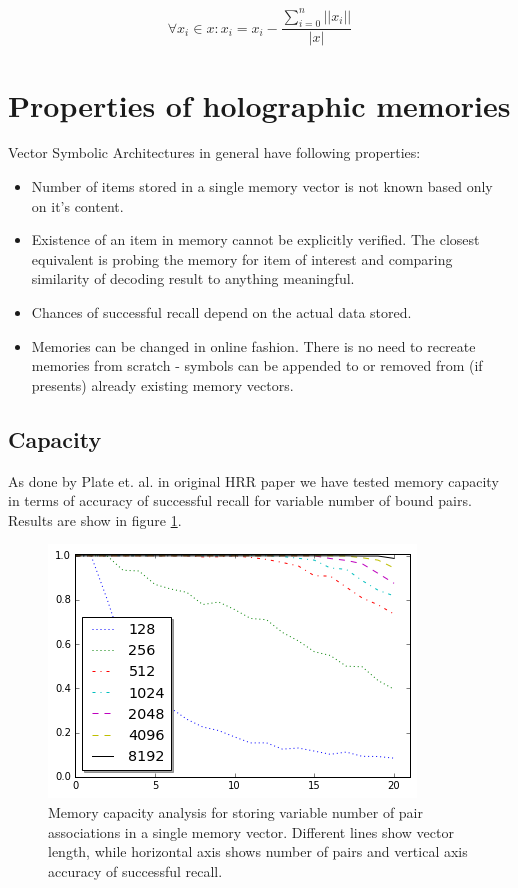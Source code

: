 \documentclass[conference]{IEEEtran}
\begin{document}
	\[ \forall x_i \in x: x_i = x_i - \frac{\sum_{i=0}^n ||x_i||}{|x|} \]
	
	\section{Properties of holographic memories}
	
	Vector Symbolic Architectures in general have following properties:
	\begin{itemize}
		\item Number of items stored in a single memory vector is not known based only on it's content.
		\item Existence of an item in memory cannot be explicitly verified. The closest equivalent is probing the memory for item of interest and comparing similarity of decoding result to anything meaningful.
		\item Chances of successful recall depend on the actual data stored.
		\item Memories can be changed in online fashion. There is no need to recreate memories from scratch - symbols can be appended to or removed from (if presents) already existing memory vectors.
	\end{itemize}
	
	\subsection{Capacity}
	
	As done by Plate et. al. in original HRR paper \cite{Plate:1995:HolographicReducedRepresentations} we have tested memory capacity in terms of accuracy of successful recall for variable number of bound pairs. Results are show in figure \ref{fig:capacity}.
	
		\begin{figure}[th!]
			\center
			\includegraphics[width=0.8\columnwidth]{img/capacity.png}
			\caption{Memory capacity analysis for storing variable number of pair associations in a single memory vector. Different lines show vector length, while horizontal axis shows number of pairs and vertical axis accuracy of successful recall.}
			\label{fig:capacity}
		\end{figure}
	
\end{document}
